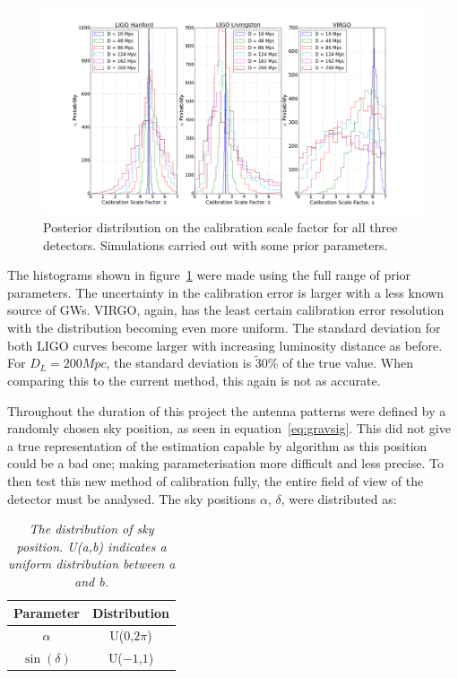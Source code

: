 \documentclass[12pt]{iopart}
\begin{document}
\begin{figure}
  \centering
  \includegraphics[width = \textwidth]{MD_non_empty_D10_200}
  \caption{Posterior distribution on the calibration scale factor for
all three detectors. Simulations carried out with some prior parameters.}
  \label{fig:mult-non-D}
\end{figure}


The histograms shown in figure~\ref{fig:mult-non-D} were made using the full
range of prior parameters. The uncertainty in the calibration error is larger
with a less known source of GWs. VIRGO, again, has the least certain
calibration error resolution with the distribution becoming even more uniform.
The standard deviation for both LIGO curves become larger with increasing
luminosity distance as before. For $D_{L} = 200Mpc$,  the standard deviation is
$\tilde 30\%$ of the true value. When comparing this to the current method,
this again is not as accurate.

Throughout the duration of this project the antenna patterns were defined by a
randomly chosen sky position, as seen in equation~\ref{eq:gravsig}. This did
not give a true representation of the estimation capable by algorithm as this
position could be a bad one; making parameterisation more difficult and less
precise. To then test this new method of calibration fully, the entire field of
view of the detector must be analysed. The sky positions $\alpha$, $\delta$,
were distributed as: \begin{table}[H] \centering \begin{tabular}{|c|c|} \hline
Parameter & Distribution \\ \hline $\alpha$       & U($0$,$2\pi$) \\
$\sin(\delta)$ & U($-1$,$1$)    \\ \hline \end{tabular} \caption{\textit{The
distribution of sky position. U(a,b) indicates a uniform distribution between a
and b.}} \label{tab:sp} \end{table}
\end{document}
